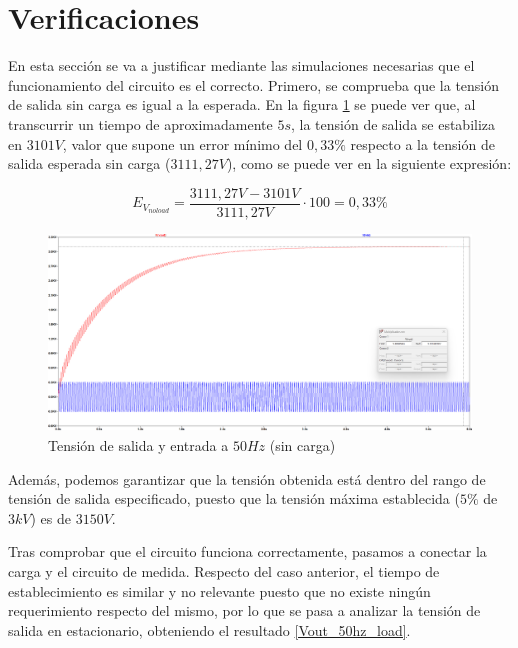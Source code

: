 \section{Verificaciones}

En esta sección se va a justificar mediante las simulaciones necesarias que el funcionamiento del circuito es el correcto.
Primero, se comprueba que la tensión de salida sin carga es igual a la esperada. En la figura \ref{Vout_50hz} se puede ver que, al transcurrir
un tiempo de aproximadamente $5s$, la tensión de salida se estabiliza en $3101V$, valor que supone un error mínimo del $0,33\%$
respecto a la tensión de salida esperada sin carga ($3111,27V$), como se puede ver en la siguiente expresión:

\begin{equation}
    E_{V_{noload}} = \frac{3111,27V - 3101V}{3111,27V} \cdot 100 = 0,33\%
\end{equation}

\begin{figure}[H]
    \centering
    \includegraphics[width=1\textwidth]{Imagenes_alvaro/Vout_50hz.png}
    \caption{Tensión de salida y entrada a $50Hz$ (sin carga)}
    \label{Vout_50hz}
\end{figure}

Además, podemos garantizar que la tensión obtenida está dentro del rango de tensión de salida especificado, puesto que la tensión máxima 
establecida ($5\%$ de $3kV$) es de $3150V$.

Tras comprobar que el circuito funciona correctamente, pasamos a conectar la carga y el circuito de medida.
Respecto del caso anterior, el tiempo de establecimiento es similar y no relevante puesto que no existe ningún requerimiento respecto del mismo, por lo que
se pasa a analizar la tensión de salida en estacionario, obteniendo el resultado \ref{Vout_50hz_load}.

